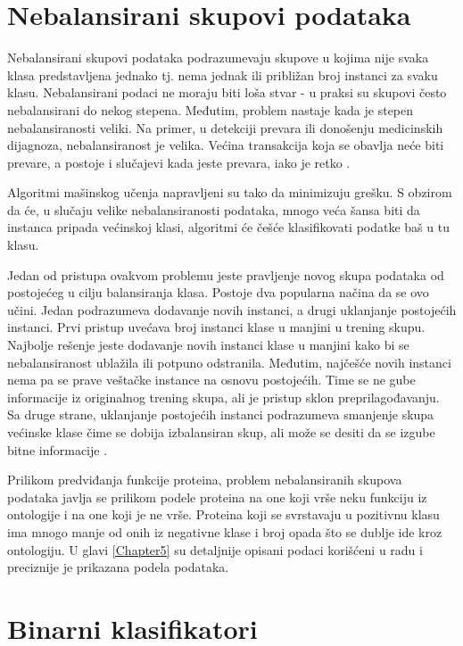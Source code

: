 \section{Nebalansirani skupovi podataka}

Nebalansirani skupovi podataka podrazumevaju skupove u kojima nije svaka klasa predstavljena jednako tj. nema jednak ili približan broj instanci za svaku klasu. Nebalansirani podaci ne moraju biti loša stvar - u praksi su skupovi često nebalansirani do nekog stepena. Međutim, problem nastaje kada je stepen nebalansiranosti veliki. Na primer, u detekciji prevara ili donošenju medicinskih dijagnoza, nebalansiranost je velika. Većina transakcija koja se obavlja neće biti prevare, a postoje i slučajevi kada jeste prevara, iako je retko \cite{handleImblMLOnl, handleImblClfOnl}. 

Algoritmi mašinskog učenja napravljeni su tako da minimizuju grešku. S obzirom da će, u slučaju velike nebalansiranosti podataka, mnogo veća šansa biti da instanca pripada većinskoj klasi, algoritmi će češće klasifikovati podatke baš u tu klasu. 

Jedan od pristupa ovakvom problemu jeste pravljenje novog skupa podataka od postojećeg u cilju balansiranja klasa. Postoje dva popularna načina da se ovo učini. Jedan podrazumeva dodavanje novih instanci, a drugi uklanjanje postojećih instanci. Prvi pristup uvećava broj instanci klase u manjini u trening skupu. Najbolje rešenje jeste dodavanje novih instanci klase u manjini kako bi se nebalansiranost ublažila ili potpuno odstranila. Međutim, najčešće novih instanci nema pa se prave veštačke instance na osnovu postojećih. Time se ne gube informacije iz originalnog trening skupa, ali je pristup sklon preprilagođavanju. Sa druge strane, uklanjanje postojećih instanci podrazumeva smanjenje skupa većinske klase čime se dobija izbalansiran skup, ali može se desiti da se izgube bitne informacije \cite{handleImblClfOnl}.

Prilikom predviđanja funkcije proteina, problem nebalansiranih skupova podataka javlja se prilikom podele proteina na one koji vrše neku funkciju iz ontologije i na one koji je ne vrše. Proteina koji se svrstavaju u pozitivnu klasu ima mnogo manje od onih iz negativne klase i broj opada što se dublje ide kroz ontologiju. U glavi \ref{Chapter5} su detaljnije opisani podaci korišćeni u radu i preciznije je prikazana podela podataka.


\section{Binarni klasifikatori}

